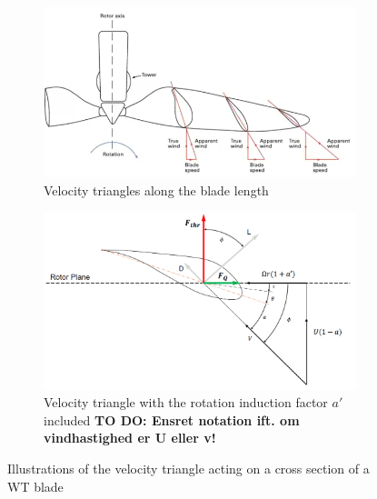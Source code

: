 \begin{figure}[h]
	\centering
	\begin{subfigure}[t]{.48\textwidth}
		\centering
		\includegraphics[width=1\linewidth]{Graphics/BladeVelTriangles.png}
		\caption{Velocity triangles along the blade length}
		\label{fig:blade_vel_triangles}
	\end{subfigure}%
	\hspace{0.2cm}
	\begin{subfigure}[t]{.48\textwidth}
		\centering
		\includegraphics[width=1\linewidth]{Graphics/AirfoilVelocityTriangle.PNG}
		\caption{Velocity triangle with the rotation induction factor $ a' $ included \textbf{TO DO: Ensret notation ift. om vindhastighed er U eller v!}}
		\label{fig:blade_vel_triangle}
	\end{subfigure}
	
	\caption{Illustrations of the velocity triangle acting on a cross section of a WT blade}
	\label{fig:blade_triangles}
\end{figure}

